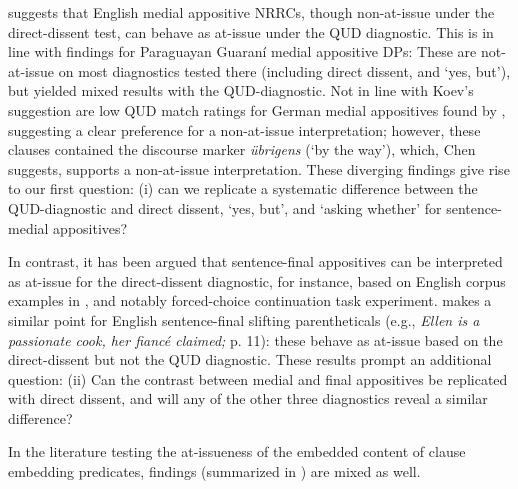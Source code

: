 \documentclass[times,linguex,xcolor]{glossa}
\begin{document}
  \citealt{koev_notions_2018} suggests that English medial appositive NRRCs, though non-at-issue under the direct-dissent test, can behave as at-issue under the QUD diagnostic. This is in line with  findings for Paraguayan Guaraní medial appositive DPs: These are not-at-issue on most diagnostics tested there (including direct dissent, and `yes, but'), but yielded mixed results with the QUD-diagnostic. Not in line with Koev's suggestion are low QUD match ratings for German medial appositives found by \citet{chen_presuppositions_2024}, suggesting a clear preference for a non-at-issue interpretation; however, these clauses contained the discourse marker \emph{übrigens} (‘by the way’), which, Chen suggests, supports a non-at-issue interpretation. These diverging findings give rise to our first question: (i) can we replicate a systematic difference between the QUD-diagnostic and direct dissent, ‘yes, but’, and `asking whether' for sentence-medial appositives?

  In contrast, it has been argued that sentence-final appositives can be interpreted as at-issue for the direct-dissent diagnostic, for instance, based on English corpus examples in \citealt{anderbois_at-issue_2015}, and notably  forced-choice continuation task experiment. \citealt{koev_notions_2018} makes a similar point for English sentence-final slifting parentheticals (e.g., \emph{Ellen is a passionate cook, her fiancé claimed;} p. 11): these behave as at-issue based on the direct-dissent but not the QUD diagnostic. These results prompt an additional question: (ii) Can the contrast between medial and final appositives be replicated with direct dissent, and will any of the other three diagnostics reveal a similar difference?

  In the literature testing the at-issueness of the embedded content of clause embedding predicates, findings (summarized in ) are mixed as well. 
\end{document}
